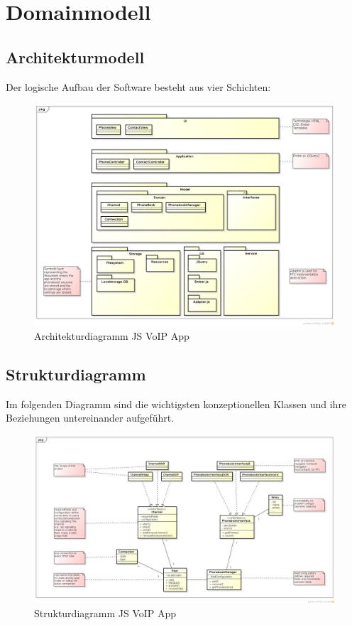 \chapter{Domainmodell}

\section{Architekturmodell}
	Der logische Aufbau der Software besteht aus vier Schichten:
	\begin{figure}[h]
		\centering
		\includegraphics[width=1\textwidth]{../architekturanalayse/img/architecture.png}
		\caption{Architekturdiagramm JS VoIP App}
	\end{figure}

	\begin{landscape}
		\section{Strukturdiagramm}
			Im folgenden Diagramm sind die wichtigsten konzeptionellen Klassen und ihre Beziehungen untereinander aufgeführt.
			\begin{figure}[h]
				\centering
				\includegraphics[width=1.2\textwidth]{../architekturanalayse/img/domain.png}
				\caption{Strukturdiagramm JS VoIP App}
			\end{figure}
	\end{landscape}
	\clearpage

